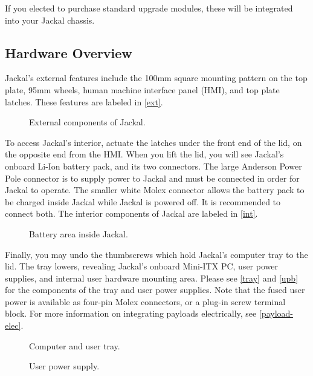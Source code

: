 \documentclass[]{clearpath-manual}
\begin{document}
If you elected to purchase standard upgrade modules, these will be integrated into your Jackal chassis.

\subsection{Hardware Overview}

Jackal's external features include the 100mm square mounting pattern on the top plate, 95mm wheels, human
machine interface panel (HMI), and top plate latches. These features are labeled in \autoref{ext}.

\begin{figure}[ht]
  \centering
  \placeholder{9cm}{5cm}
  \caption{External components of Jackal.}
  \label{ext}
\end{figure}

To access Jackal's interior, actuate the latches under the front end of the lid, on the opposite end from
the HMI. When you lift the lid, you will see Jackal's onboard Li-Ion battery pack, and its two connectors.
The large Anderson Power Pole connector is to supply power to Jackal and must be connected in order for
Jackal to operate. The smaller white Molex connector allows the battery pack to be charged inside Jackal 
while Jackal is powered off. It is recommended to connect both. The interior components of Jackal are
labeled in \autoref{int}.

\begin{figure}[ht]
  \centering
  \placeholder{9cm}{5cm}
  \caption{Battery area inside Jackal.}
  \label{int}
\end{figure}

Finally, you may undo the thumbscrews which hold Jackal's computer tray to the lid. The tray lowers,
revealing Jackal's onboard Mini-ITX PC, user power supplies, and internal user hardware mounting area.
Please see \autoref{tray} and \autoref{upb} for the components of the tray and user power supplies.
Note that the fused user power is available as four-pin Molex connectors, or a plug-in screw terminal
block. For more information on integrating payloads electrically, see \autoref{payload-elec}.

\begin{figure}[pt]
  \centering
  \placeholder{12cm}{8cm}
  \caption{Computer and user tray.}
  \label{tray}
\end{figure}

\begin{figure}[pb]
  \centering
  \def\svgwidth{13cm}
  
  \caption{User power supply.}
  \label{upb}
\end{figure}
\end{document}
